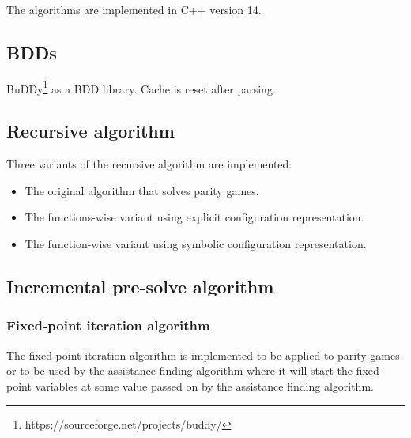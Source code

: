The algorithms are implemented in C++ version 14. 
\subsection{BDDs}
BuDDy\footnote{\label{note1}https://sourceforge.net/projects/buddy/} as a BDD library. Cache is reset after parsing.
\subsection{Recursive algorithm}
Three variants of the recursive algorithm are implemented:
\begin{itemize}
	\item The original algorithm that solves parity games.
	\item The functions-wise variant using explicit configuration representation.
	\item The function-wise variant using symbolic configuration representation.
\end{itemize}
\subsection{Incremental pre-solve algorithm}
\subsubsection{Fixed-point iteration algorithm}
The fixed-point iteration algorithm is implemented to be applied to parity games or to be used by the assistance finding algorithm where it will start the fixed-point variables at some value passed on by the assistance finding algorithm.

